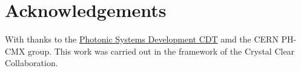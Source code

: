 \section*{Acknowledgements}
With thanks to the \href{https://www.photonicsystems.org/}{Photonic Systems Development CDT} amd the CERN PH-CMX group. This work was carried out in the framework of the Crystal Clear Collaboration. 